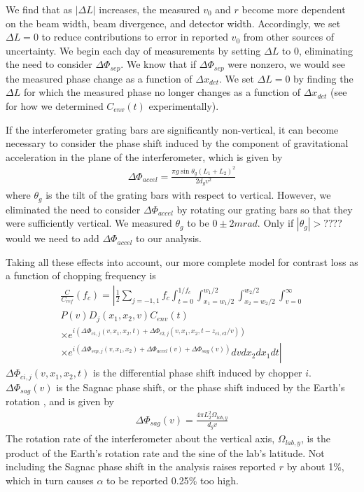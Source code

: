 \documentclass[twocolumn,prl,showpacs,superscriptaddress]{revtex4-1}   %
\begin{document}
We find that as $\left|\Delta L\right|$ increases, the measured $v_0$ and $r$ become more dependent on the beam width, beam divergence, and detector width. Accordingly, we set $\Delta L = 0$ to reduce contributions to error in reported $v_0$ from other sources of uncertainty. We begin each day of measurements by setting $\Delta L$ to 0, eliminating the need to consider $\Delta\Phi_{sep}$. We know that if $\Delta\Phi_{sep}$ were nonzero, we would see the measured phase change as a function of $\Delta x_{det}$. We set $\Delta L = 0$ by finding the $\Delta L$ for which the measured phase no longer changes as a function of $\Delta x_{det}$ (see \cite{Hromada2014} for how we determined $C_{env}(t)$ experimentally).


If the interferometer grating bars are significantly non-vertical, it can become necessary to consider the phase shift induced by the component of gravitational acceleration in the plane of the interferometer, which is given by
\begin{align}
	\Delta\Phi_{accel} = \frac{\pi g\sin{\theta_g}(L_1+L_2)^2}{2d_g v^2}
	\label{phiAccel}
\end{align}
where $\theta_g$ is the tilt of the grating bars with respect to vertical. However, we eliminated the need to consider $\Delta\Phi_{accel}$ by rotating our grating bars so that they were sufficiently vertical. We measured $\theta_g$ to be $0 \pm 2 mrad$. Only if $|\theta_g| > ????$ would we need to add $\Delta\Phi_{accel}$ to our analysis.

Taking all these effects into account, our more complete model for contrast loss as a function of chopping frequency is
\begin{align}
	\frac{C}{C_{ref}}(f_c) = 
	\left|
		\frac{1}{2} \sum_{j=-1,1}
		f_c \int_{t=0}^{1/f_c} 
		\int_{x_1=w_1/2}^{w_1/2}
		\int_{x_2=w_2/2}^{w_2/2}
		\int_{v=0}^{\infty}           
		\right. \nonumber \\
		P(v)
		D_j(x_1, x_2, v)
		C_{env}(t)                   
		\nonumber \\ \times
		e^{i( \Delta\Phi_{c1,j}(v,x_1,x_2,t) + \Delta\Phi_{c2,j}(v,x_1,x_2,t-z_{c1,c2}/v) )}
		\nonumber \\ \times \left.
		e^{i( \Delta\Phi_{sep,j}(v,x_1,x_2) + \Delta\Phi_{accel}(v) + \Delta\Phi_{sag}(v) )}
		dv dx_{2} dx_{1} dt
	\right|
	\label{CvCF}
\end{align}
$\Delta\Phi_{ci,j}(v,x_1,x_2,t)$ is the differential phase shift induced by chopper $i$. $\Delta\Phi_{sag}(v)$ is the Sagnac phase shift, or the phase shift induced by the Earth's rotation \cite{Lenef1997,Jacquey2008}, and is given by
\begin{align}
	\Delta\Phi_{sag}(v) = \frac{4\pi L_2^2\Omega_{lab,y}}{d_g v}
	\label{phiSag}
\end{align}
The rotation rate of the interferometer about the vertical axis, $\Omega_{lab,y}$, is the product of the Earth's rotation rate and the sine of the lab's latitude. Not including the Sagnac phase shift in the analysis raises reported $r$ by about 1\%, which in turn causes $\alpha$ to be reported 0.25\% too high.
\end{document}
